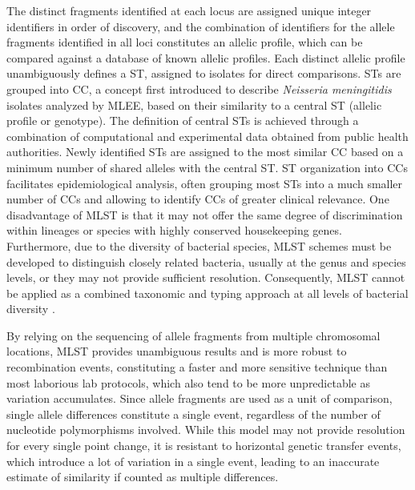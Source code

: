 The distinct fragments identified at each locus are assigned unique integer identifiers in order of discovery, and the combination of identifiers for the allele fragments identified in all loci constitutes an allelic profile, which can be compared against a database of known allelic profiles. Each distinct allelic profile unambiguously defines a \ac{ST}, assigned to isolates for direct comparisons. \ac{ST}s are grouped into \ac{CC}, a concept first introduced to describe \textit{Neisseria meningitidis} isolates analyzed by \ac{MLEE}, based on their similarity to a central \ac{ST} (allelic profile or genotype). The definition of central \ac{ST}s is achieved through a combination of computational and experimental data obtained from public health authorities. Newly identified \ac{ST}s are assigned to the most similar \ac{CC} based on a minimum number of shared alleles with the central \ac{ST}. \ac{ST} organization into \ac{CC}s facilitates epidemiological analysis, often grouping most \ac{ST}s into a much smaller number of \ac{CC}s and allowing to identify \ac{CC}s of greater clinical relevance. One disadvantage of \ac{MLST} is that it may not offer the same degree of discrimination within lineages or species with highly conserved housekeeping genes. Furthermore, due to the diversity of bacterial species, \ac{MLST} schemes must be developed to distinguish closely related bacteria, usually at the genus and species levels, or they may not provide sufficient resolution. Consequently, \ac{MLST} cannot be applied as a combined taxonomic and typing approach at all levels of bacterial diversity \cite{jolley_ribosomal_2012}.

By relying on the sequencing of allele fragments from multiple chromosomal locations, \ac{MLST} provides unambiguous results and is more robust to recombination events, constituting a faster and more sensitive technique than most laborious lab protocols, which also tend to be more unpredictable as variation accumulates. Since allele fragments are used as a unit of comparison, single allele differences constitute a single event, regardless of the number of nucleotide polymorphisms involved. While this model may not provide resolution for every single point change, it is resistant to horizontal genetic transfer events, which introduce a lot of variation in a single event, leading to an inaccurate estimate of similarity if counted as multiple differences.

